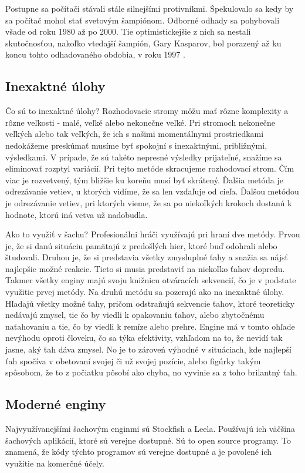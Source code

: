 \documentclass[10pt,twoside,slovak,a4paper]{article}
\begin{document}
Postupne sa počítači stávali stále silnejšími protivníkmi. Špekulovalo sa kedy by sa počítač mohol stať svetovým šampiónom. Odborné odhady sa pohybovali všade od roku 1980 až po 2000. Tie optimistickejšie z nich sa nestali skutočnosťou, nakoľko vtedajší šampión, Gary Kasparov, bol porazený až ku koncu tohto odhadovaného obdobia, v roku 1997 \cite{Pandolfini:KasparovLoss}.

\subsection{Inexaktné úlohy} \label{enginy:inexactTask}
Čo sú to inexaktné úlohy? Rozhodovacie stromy môžu mať rôzne komplexity a rôzne veľkosti - malé, veľké alebo nekonečne veľké. Pri stromoch nekonečne veľkých alebo tak veľkých, že ich s našimi momentálnymi prostriedkami nedokážeme preskúmať musíme byť spokojní s inexaktnými, približnými, výsledkami. V prípade, že sú takéto nepresné výsledky prijateľné, snažíme sa eliminovať rozptyl variácií. Pri tejto metóde skracujeme rozhodovací strom. Čím viac je rozvetvený, tým bližšie ku koreňu musí byť skrátený. Ďalšia metóda je odrezávanie vetiev, u ktorých vidíme, že sa len vzďaľuje od cieľa. Ďalšou metódou je odrezávanie vetiev, pri ktorých vieme, že sa po niekoľkých krokoch dostanú k hodnote, ktorú iná vetva už nadobudla.

Ako to využiť v šachu? Profesionálni hráči využívajú pri hraní dve metódy. Prvou je, že si danú situáciu pamätajú z predošlých hier, ktoré buď odohrali alebo študovali. Druhou je, že si predstavia všetky zmysluplné ťahy a snažia sa nájsť najlepšie možné reakcie. Tieto si musia predstaviť na niekoľko ťahov dopredu. Takmer všetky enginy majú svoju knižnicu otváracích sekvencií, čo je v podstate využitie prvej metódy. Na druhú metódu sa pozerajú ako na inexaktné úlohy. Hľadajú všetky možné ťahy, pričom odstraňujú sekvencie ťahov, ktoré teoreticky nedávajú zmysel, tie čo by viedli k opakovaniu ťahov, alebo zbytočnému naťahovaniu a tie, čo by viedli k remíze alebo prehre. Engine má v tomto ohľade nevýhodu oproti človeku, čo sa týka efektivity, vzhľadom na to, že nevidí tak jasne, aký ťah dáva zmysel. No je to zároveń výhodné v situáciach, kde najlepší ťah spočíva v obetovaní svojej či už svojej pozície, alebo figúrky takým spôsobom, že to z počiatku pôsobí ako chyba, no vyvinie sa z toho brilantný ťah.

\subsection{Moderné enginy} \label{newEngines}
Najvyužívanejšími šachovým enginmi sú Stockfish a Leela. Používajú ich väčšina šachových aplikácií, ktoré sú verejne dostupné. Sú to open source programy. To znamená, že kódy týchto programov sú verejne dostupné a je povolené ich využitie na komerčné účely. 
\end{document}

